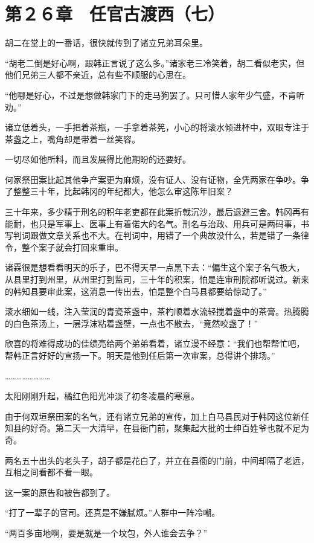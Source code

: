 \section{第２６章　任官古渡西（七）}

胡二在堂上的一番话，很快就传到了诸立兄弟耳朵里。

“胡老二倒是好心啊，跟韩正言说了这么多。”诸家老三冷笑着，胡二看似老实，但他们兄弟三人都不亲近，总有些不顺服的心思在。

“他哪是好心，不过是想做韩家门下的走马狗罢了。只可惜人家年少气盛，不肯听劝。”

诸立低着头，一手把着茶瓶，一手拿着茶筅，小心的将滚水倾进杯中，双眼专注于茶盏之上，嘴角却是带着一丝笑容。

一切尽如他所料，而且发展得比他期盼的还要好。

何家祭田案比起其他争产案更为麻烦，没有证人、没有证物，全凭两家在争吵。争了整整三十年，比起韩冈的年纪都大，他怎么审这陈年旧案？

三十年来，多少精于刑名的积年老吏都在此案折戟沉沙，最后退避三舍。韩冈再有能耐，也只是军事上、医事上有着偌大的名气。刑名与治政、用兵可是两码事，书写判词跟做文章关系也不大。在判词中，用错了一个典故没什么，若是错了一条律令，整个案子就会打回来重审。

诸霖很是想看看明天的乐子，巴不得天早一点黑下去：“偏生这个案子名气极大，从县里打到州里，从州里打到监司，三十年的积案，怕是连审刑院都听说过。新来的韩知县要审此案，这消息一传出去，怕是整个白马县都要给惊动了。”

滚水细如一线，注入莹润的青瓷茶盏中，茶杓顺着水流轻搅着盏中的茶膏。热腾腾的白色茶汤上，一层浮沫粘着盏壁，一点也不散去，“竟然咬盏了！”

欣喜的将难得成功的佳绩亮给两个弟弟看着，诸立漫不经意：“我们也帮帮忙吧，帮韩正言好好的宣扬一下。明天是他到任后第一次审案，总得讲个排场。”

……………………

太阳刚刚升起，橘红色阳光冲淡了初冬凌晨的寒意。

由于何双垣祭田案的名气，还有诸立兄弟的宣传，加上白马县民对于韩冈这位新任知县的好奇。第二天一大清早，在县衙门前，聚集起大批的士绅百姓爷也就不足为奇。

两名五十出头的老头子，胡子都是花白了，并立在县衙的门前，中间却隔了老远，互相之间看都不看一眼。

这一案的原告和被告都到了。

“打了一辈子的官司。还真是不嫌腻烦。”人群中一阵冷嘲。

“两百多亩地啊，要是就是一个坟包，外人谁会去争？”


